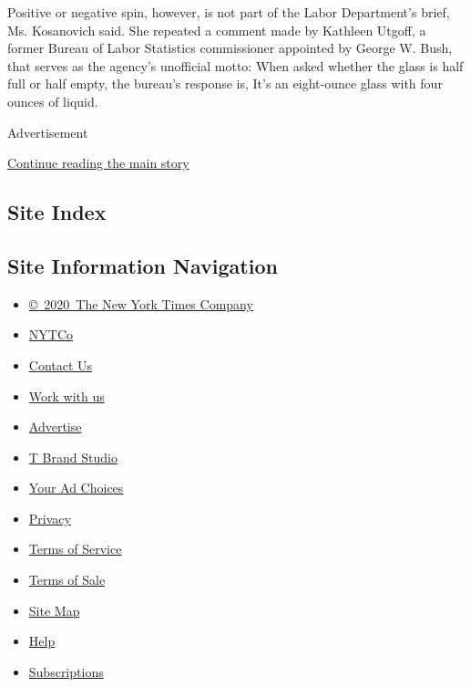 Positive or negative spin, however, is not part of the Labor
Department's brief, Ms. Kosanovich said. She repeated a comment made by
Kathleen Utgoff, a former Bureau of Labor Statistics commissioner
appointed by George W. Bush, that serves as the agency's unofficial
motto: When asked whether the glass is half full or half empty, the
bureau's response is, It's an eight-ounce glass with four ounces of
liquid.

Advertisement

\protect\hyperlink{after-bottom}{Continue reading the main story}

\hypertarget{site-index}{%
\subsection{Site Index}\label{site-index}}

\hypertarget{site-information-navigation}{%
\subsection{Site Information
Navigation}\label{site-information-navigation}}

\begin{itemize}
\tightlist
\item
  \href{https://help.nytimes.com/hc/en-us/articles/115014792127-Copyright-notice}{©~2020~The
  New York Times Company}
\end{itemize}

\begin{itemize}
\tightlist
\item
  \href{https://www.nytco.com/}{NYTCo}
\item
  \href{https://help.nytimes.com/hc/en-us/articles/115015385887-Contact-Us}{Contact
  Us}
\item
  \href{https://www.nytco.com/careers/}{Work with us}
\item
  \href{https://nytmediakit.com/}{Advertise}
\item
  \href{http://www.tbrandstudio.com/}{T Brand Studio}
\item
  \href{https://www.nytimes.com/privacy/cookie-policy\#how-do-i-manage-trackers}{Your
  Ad Choices}
\item
  \href{https://www.nytimes.com/privacy}{Privacy}
\item
  \href{https://help.nytimes.com/hc/en-us/articles/115014893428-Terms-of-service}{Terms
  of Service}
\item
  \href{https://help.nytimes.com/hc/en-us/articles/115014893968-Terms-of-sale}{Terms
  of Sale}
\item
  \href{https://spiderbites.nytimes.com}{Site Map}
\item
  \href{https://help.nytimes.com/hc/en-us}{Help}
\item
  \href{https://www.nytimes.com/subscription?campaignId=37WXW}{Subscriptions}
\end{itemize}
